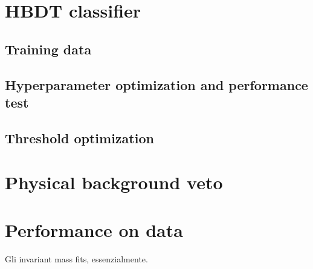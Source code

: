 \section{HBDT classifier}
\label{sec:HBDT}

\subsection{Training data}

\subsection{Hyperparameter optimization and performance test}

\subsection{Threshold optimization}

\section{Physical background veto}
\label{sec:B0_veto}

\section{Performance on data}
Gli invariant mass fits, essenzialmente.
